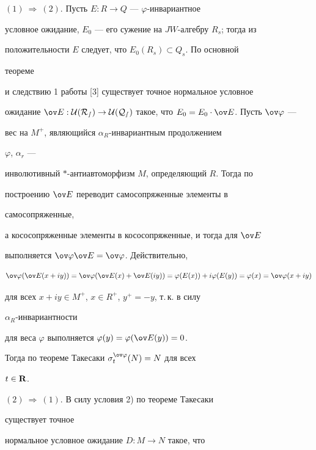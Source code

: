  


\begin{pf} 


$(1)\ \Rightarrow\ (2)$. Пусть $E:R\to Q$ --- $\varphi$-инвариантное 


условное ожидание, $E_0$ --- его сужение на $JW$-алгебру $R_s$; тогда из 


положительности $E$ следует, что $E_0(R_s)\subset Q_s$. По основной 


теореме 


и следствию 1 работы [3] существует точное нормальное условное 


ожидание $\ov E:\cal U(R_s)\to\cal U(Q_s)$ такое, что $E_0=E_0\cdot\ov 


E$. Пусть $\ov\varphi$ --- 


вес на $M^+$, являющийся $\alpha_R$-инвариантным продолжением 


$\varphi$, $\alpha_r$ --- 


инволютивный $*$-антиавтоморфизм $M$, определяющий $R$. Тогда по 


построению $\ov E$ переводит самосопряженные элементы в 


самосопряженные, 


а кососопряженные элементы в кососопряженные, и тогда для $\ov E$


выполняется $\ov\varphi\ov E=\ov\varphi$. Действительно, 


$$ 


\ov\varphi(\ov E(x+iy))=\ov\varphi(\ov E(x)+ 


\ov E(iy))=\varphi(E(x))+i\varphi(E(y))= 


\varphi(x)=\ov\varphi(x+iy) 


$$ 


для всех $x+iy\in M^+$, $x\in R^+$, $y^+=-y$, т.\,к. в силу 


$\alpha_R$-инвариантности 


для веса $\varphi$ выполняется $\varphi(y)=\varphi(\ov E(y))=0$. 


Тогда по теореме Такесаки $\sigma^{\ov\varphi}_t(N)=N$ для всех 


$t\in\bold R$. 


\smallskip 


 


$(2)\ \Rightarrow\ (1)$. В силу условия 2) по теореме Такесаки 


существует точное 


нормальное условное ожидание $D:M\to N$ такое, что 



\end{pf}
